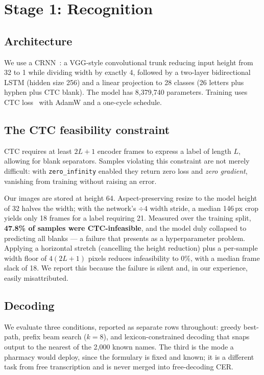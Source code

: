 \documentclass[conference]{IEEEtran}
\begin{document}
\section{Stage 1: Recognition}\label{sec:stage1}

\subsection{Architecture}
We use a CRNN~\cite{shi2017crnn}: a VGG-style convolutional trunk reducing input
height from 32 to 1 while dividing width by exactly 4, followed by a two-layer
bidirectional LSTM (hidden size 256) and a linear projection to 28 classes
(26 letters plus hyphen plus CTC blank). The model has 8{,}379{,}740 parameters.
Training uses CTC loss~\cite{graves2006ctc} with AdamW and a one-cycle schedule.

\subsection{The CTC feasibility constraint}\label{sec:feasibility}
CTC requires at least $2L+1$ encoder frames to express a label of length $L$,
allowing for blank separators. Samples violating this constraint are not merely
difficult: with \texttt{zero\_infinity} enabled they return zero loss and
\emph{zero gradient}, vanishing from training without raising an error.

Our images are stored at height 64. Aspect-preserving resize to the model height
of 32 halves the width; with the network's $\div4$ width stride, a median
146\,px crop yields only 18 frames for a label requiring 21. Measured over the
training split, \textbf{47.8\% of samples were CTC-infeasible}, and the model
duly collapsed to predicting all blanks --- a failure that presents as a
hyperparameter problem. Applying a horizontal stretch (cancelling the height
reduction) plus a per-sample width floor of $4(2L+1)$ pixels reduces
infeasibility to 0\%, with a median frame slack of 18. We report this because
the failure is silent and, in our experience, easily misattributed.

\subsection{Decoding}
We evaluate three conditions, reported as separate rows throughout: greedy
best-path, prefix beam search ($k=8$), and lexicon-constrained decoding that
snaps output to the nearest of the 2{,}000 known names. The third is the mode a
pharmacy would deploy, since the formulary is fixed and known; it is a different
task from free transcription and is never merged into free-decoding CER.
\end{document}
